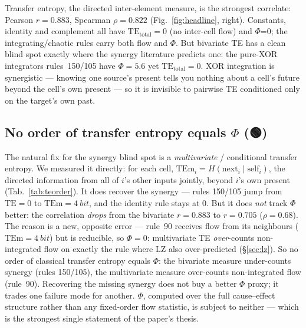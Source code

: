 \documentclass[11pt,a4paper]{article}
\providecommand{\tierGreen}{🟢}
\newcommand{\bigphi}{\ensuremath{\Phi}}
\begin{document}
Transfer entropy, the directed inter-element measure, is the strongest
correlate: Pearson \(r=0.883\), Spearman \(\rho=0.822\)
(Fig.~\ref{fig:headline}, right). Constants, identity and complement all
have \(\mathrm{TE}_\mathrm{total}=0\) (no inter-cell flow) and
\bigphi{}=0; the integrating/chaotic rules carry both flow and \bigphi{}.
But bivariate TE has a clean blind spot exactly where the synergy
literature predicts one: the pure-XOR integrators rules~150/105 have
\(\bigphi=5.6\) yet \(\mathrm{TE}_\mathrm{total}=0\). XOR integration is
synergistic --- knowing one source's present tells you nothing about a
cell's future beyond the cell's own present --- so it is invisible to
pairwise TE conditioned only on the target's own past.

\subsection{No order of transfer entropy equals \bigphi{} (\tierGreen)}
\label{sec:teorder}

The natural fix for the synergy blind spot is a \emph{multivariate} /
conditional transfer entropy. We measured it directly: for each cell,
\(\mathrm{TEm}_i = H(\mathrm{next}_i \mid \mathrm{self}_i)\), the directed
information from all of \(i\)'s other inputs jointly, beyond \(i\)'s own
present (Tab.~\ref{tab:teorder}). It does recover the synergy --- rules
150/105 jump from \(\mathrm{TE}=0\) to \(\mathrm{TEm}=\SI{4}{bit}\), and the
identity rule stays at \(0\). But it does \emph{not} track \bigphi{} better:
the correlation \emph{drops} from the bivariate \(r=0.883\) to \(r=0.705\)
(\(\rho=0.68\)). The reason is a new, opposite error --- rule~90 receives
flow from its neighbours (\(\mathrm{TEm}=\SI{4}{bit}\)) but is reducible, so
\(\bigphi=0\): multivariate TE \emph{over}-counts non-integrated flow on
exactly the rule where LZ also over-predicted (\S\ref{sec:lz}). So no order
of classical transfer entropy equals \bigphi{}: the bivariate measure
under-counts synergy (rules 150/105), the multivariate measure over-counts
non-integrated flow (rule~90). Recovering the missing synergy does not buy
a better \bigphi{} proxy; it trades one failure mode for another. \bigphi{},
computed over the full cause--effect structure rather than any fixed-order
flow statistic, is subject to neither --- which is the strongest single
statement of the paper's thesis.
\end{document}
